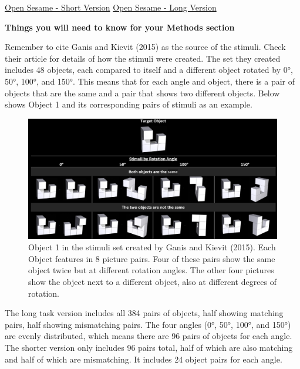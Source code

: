 \documentclass[
]{book}
\begin{document}
\href{https://github.com/jmattschey/MScConversionExperiments/blob/master/GitHub/SpatialRotationShort.zip}{Open Sesame - Short Version} \textbar{} \href{https://github.com/jmattschey/MScConversionExperiments/blob/master/GitHub/SpatialRotationLong.osexp}{Open Sesame - Long Version}

\textbf{Things you will need to know for your Methods section}

Remember to cite Ganis and Kievit (2015) as the source of the stimuli. Check their article for details of how the stimuli were created. The set they created includes 48 objects, each compared to itself and a different object rotated by 0°, 50°, 100°, and 150°. This means that for each angle and object, there is a pair of objects that are the same and a pair that shows two different objects. Below shows Object 1 and its corresponding pairs of stimuli as an example.

\begin{figure}

{\centering \includegraphics[width=0.99\linewidth]{images/RotationOverview} 

}

\caption{Object 1 in the stimuli set created by Ganis and Kievit (2015). Each Object features in 8 picture pairs. Four of these pairs show the same object twice but at different rotation angles. The other four pictures show the object next to a different object, also at different degrees of rotation.}\label{fig:Figure5-2}
\end{figure}

The long task version includes all 384 pairs of objects, half showing matching pairs, half showing mismatching pairs. The four angles (0°, 50°, 100°, and 150°) are evenly distributed, which means there are 96 pairs of objects for each angle. The shorter version only includes 96 pairs total, half of which are also matching and half of which are mismatching. It includes 24 object pairs for each angle.
\end{document}
